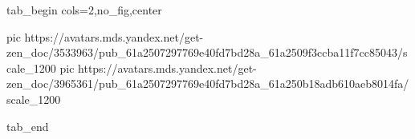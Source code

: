  
 
 
 
 


\ifcmt
  tab_begin cols=2,no_fig,center

     pic https://avatars.mds.yandex.net/get-zen_doc/3533963/pub_61a2507297769e40fd7bd28a_61a2509f3ccba11f7cc85043/scale_1200
		 pic https://avatars.mds.yandex.net/get-zen_doc/3965361/pub_61a2507297769e40fd7bd28a_61a250b18adb610aeb8014fa/scale_1200

  tab_end
\fi
